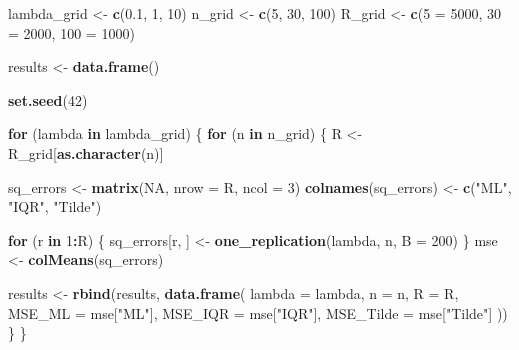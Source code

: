 \documentclass[
]{article}
\newenvironment{Shaded}{\begin{snugshade}}{\end{snugshade}}
\newcommand{\AttributeTok}[1]{\textcolor[rgb]{0.13,0.29,0.53}{#1}}
\newcommand{\ConstantTok}[1]{\textcolor[rgb]{0.56,0.35,0.01}{#1}}
\newcommand{\ControlFlowTok}[1]{\textcolor[rgb]{0.13,0.29,0.53}{\textbf{#1}}}
\newcommand{\DecValTok}[1]{\textcolor[rgb]{0.00,0.00,0.81}{#1}}
\newcommand{\FloatTok}[1]{\textcolor[rgb]{0.00,0.00,0.81}{#1}}
\newcommand{\FunctionTok}[1]{\textcolor[rgb]{0.13,0.29,0.53}{\textbf{#1}}}
\newcommand{\NormalTok}[1]{#1}
\newcommand{\OtherTok}[1]{\textcolor[rgb]{0.56,0.35,0.01}{#1}}
\newcommand{\SpecialCharTok}[1]{\textcolor[rgb]{0.81,0.36,0.00}{\textbf{#1}}}
\newcommand{\StringTok}[1]{\textcolor[rgb]{0.31,0.60,0.02}{#1}}
\begin{document}
\begin{Shaded}
\begin{Highlighting}[]
\NormalTok{lambda\_grid }\OtherTok{\textless{}{-}} \FunctionTok{c}\NormalTok{(}\FloatTok{0.1}\NormalTok{, }\DecValTok{1}\NormalTok{, }\DecValTok{10}\NormalTok{)}
\NormalTok{n\_grid }\OtherTok{\textless{}{-}} \FunctionTok{c}\NormalTok{(}\DecValTok{5}\NormalTok{, }\DecValTok{30}\NormalTok{, }\DecValTok{100}\NormalTok{)}
\NormalTok{R\_grid }\OtherTok{\textless{}{-}} \FunctionTok{c}\NormalTok{(}\StringTok{\textasciigrave{}}\AttributeTok{5}\StringTok{\textasciigrave{}} \OtherTok{=} \DecValTok{5000}\NormalTok{, }\StringTok{\textasciigrave{}}\AttributeTok{30}\StringTok{\textasciigrave{}} \OtherTok{=} \DecValTok{2000}\NormalTok{, }\StringTok{\textasciigrave{}}\AttributeTok{100}\StringTok{\textasciigrave{}} \OtherTok{=} \DecValTok{1000}\NormalTok{)}

\NormalTok{results }\OtherTok{\textless{}{-}} \FunctionTok{data.frame}\NormalTok{()}

\FunctionTok{set.seed}\NormalTok{(}\DecValTok{42}\NormalTok{)}

\ControlFlowTok{for}\NormalTok{ (lambda }\ControlFlowTok{in}\NormalTok{ lambda\_grid) \{}
 \ControlFlowTok{for}\NormalTok{ (n }\ControlFlowTok{in}\NormalTok{ n\_grid) \{}
\NormalTok{   R }\OtherTok{\textless{}{-}}\NormalTok{ R\_grid[}\FunctionTok{as.character}\NormalTok{(n)]}
   
\NormalTok{   sq\_errors }\OtherTok{\textless{}{-}} \FunctionTok{matrix}\NormalTok{(}\ConstantTok{NA}\NormalTok{, }\AttributeTok{nrow =}\NormalTok{ R, }\AttributeTok{ncol =} \DecValTok{3}\NormalTok{)}
   \FunctionTok{colnames}\NormalTok{(sq\_errors) }\OtherTok{\textless{}{-}} \FunctionTok{c}\NormalTok{(}\StringTok{"ML"}\NormalTok{, }\StringTok{"IQR"}\NormalTok{, }\StringTok{"Tilde"}\NormalTok{)}
   
   \ControlFlowTok{for}\NormalTok{ (r }\ControlFlowTok{in} \DecValTok{1}\SpecialCharTok{:}\NormalTok{R) \{}
\NormalTok{     sq\_errors[r, ] }\OtherTok{\textless{}{-}} \FunctionTok{one\_replication}\NormalTok{(lambda, n, }\AttributeTok{B =} \DecValTok{200}\NormalTok{)}
\NormalTok{   \}}
\NormalTok{   mse }\OtherTok{\textless{}{-}} \FunctionTok{colMeans}\NormalTok{(sq\_errors)}
   
\NormalTok{   results }\OtherTok{\textless{}{-}} \FunctionTok{rbind}\NormalTok{(results, }\FunctionTok{data.frame}\NormalTok{(}
     \AttributeTok{lambda =}\NormalTok{ lambda,}
     \AttributeTok{n =}\NormalTok{ n,}
     \AttributeTok{R =}\NormalTok{ R,}
     \AttributeTok{MSE\_ML =}\NormalTok{ mse[}\StringTok{"ML"}\NormalTok{],}
     \AttributeTok{MSE\_IQR =}\NormalTok{ mse[}\StringTok{"IQR"}\NormalTok{],}
     \AttributeTok{MSE\_Tilde =}\NormalTok{ mse[}\StringTok{"Tilde"}\NormalTok{]}
\NormalTok{   ))}
\NormalTok{ \} }
\NormalTok{\}}


\end{Highlighting}
\end{Shaded}
\end{document}
